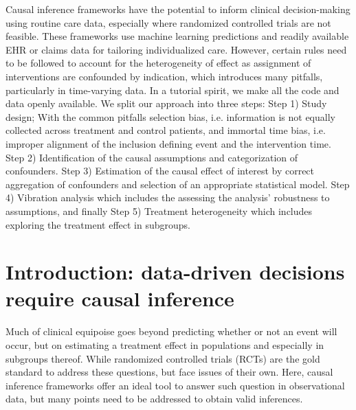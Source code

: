 \documentclass[10pt,letterpaper]{article}
\begin{document}
Causal inference frameworks have the potential to inform clinical
decision-making using routine care data, especially where randomized controlled
trials are not feasible. These frameworks use machine learning predictions and
readily available EHR or claims data for tailoring individualized care. However,
certain rules need to be followed to account for the heterogeneity of effect as
assignment of interventions are confounded by indication, which introduces many
pitfalls, particularly in time-varying data. In a tutorial spirit, we make all
the code and data openly available. We split our approach into three steps: Step
1) Study design; With the common pitfalls selection bias, i.e. information is
not equally collected across treatment and control patients, and immortal time
bias, i.e. improper alignment of the inclusion defining event and the
intervention time. Step 2) Identification of the causal assumptions and
categorization of confounders. Step 3) Estimation of the causal effect of
interest by correct aggregation of confounders and selection of an appropriate
statistical model. Step 4) Vibration analysis which includes the assessing the
analysis' robustness to assumptions, and finally Step 5) Treatment heterogeneity
which includes exploring the treatment effect in subgroups.


\linenumbers

\section*{Introduction: data-driven decisions require causal inference}

Much of clinical equipoise goes beyond predicting whether or not an event will occur, but on estimating a treatment effect in populations and especially in subgroups thereof. While randomized controlled trials (RCTs) are the gold standard to address these questions, but face issues of their own. Here, causal inference frameworks offer an ideal tool to answer such question in observational data, but many points need to be addressed to obtain valid inferences.
\end{document}
